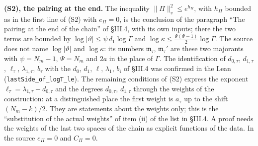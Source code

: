 \documentclass[11pt,letterpaper]{article}
\begin{document}
\textbf{(S2), the pairing at the end.} The inequality $\|\Pi\|_v^2\le e^{h_\Pi}$, with $h_\Pi$ bounded
as in the first line of (S2) with $e_\Pi=0$, is the conclusion of the paragraph ``The pairing at the end
of the chain'' of \S III.4, with its own inputs; there the two terms are bounded by
$\log|\vartheta|\le\psi\,d_1\log\Gamma$ and $\log\kappa\le\frac{\Psi(\Psi-1)}2\log\Gamma$. The source
does not name $\log|\vartheta|$ and $\log\kappa$: its numbers $\mathfrak m_\tau$, $\mathfrak m_\tau'$ are
these two majorants with $\psi=N_m-1$, $\Psi=N_m$ and $2a$ in the place of $\Gamma$. The identification
of $d_{0,\tau}$, $d_{1,\tau}$, $\ell_\tau$, $\lambda_{1,\tau}$, $b_\tau$ with the $d_0$, $d_1$, $\ell$,
$\lambda_1$, $b_{\mathfrak t}$ of \S III.4 was confirmed in the Lean
(\texttt{lastSide\_of\_logT\_le}). The remaining conditions of (S2) express the exponent
$\ell_\tau=\lambda_{1,\tau}-d_{0,\tau}$ and the degrees $d_{0,\tau}$, $d_{1,\tau}$ through the weights of
the construction: at a distinguished place the first weight is $a_\tau$ up to the shift $(N_m-k)/2$. They
are statements about the weights only; this is the ``substitution of the actual weights'' of item (ii)
of the list in \S III.4. A proof needs the weights of the last two spaces of the chain as explicit
functions of the data. In the source $e_\Pi=0$ and $C_\Pi=0$.
\end{document}

